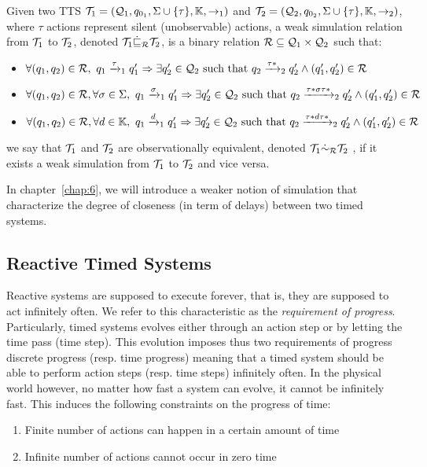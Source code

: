 \begin{definition}
  Given two TTS $\mathcal{T}_{1}=(\mathcal{Q}_{1},q_{0_{1}},\Sigma \cup\{\tau\},\mathbb{K},\to_{1})$ and $\mathcal{T}_{2}=(\mathcal{Q}_{2},q_{0_{2}},\Sigma \cup\{\tau\},\mathbb{K},\to_{2})$, where $\tau$ actions 
  represent silent (unobservable) actions, a weak simulation relation from 
  $\mathcal{T}_1$ to $\mathcal{T}_2$, denoted $\mathcal{T}_1\dot{\sqsubseteq}_{\mathcal{R}}\mathcal{T}_2$, 
  is a binary relation $\mathcal{R}\subseteq\mathcal{Q}_1
  \times\mathcal{Q}_2$ such that:
  \begin{itemize}
    \item $\forall(q_1,q_2)\in\mc{R},\ 
      q_1\transitb{\tau}{1}q_1'\Rightarrow\exists q'_2\in\mc{Q}_2 
      \text{ such that } q_2\transitb{\tau*}{2}q_2'\wedge
      (q_1',q_2')\in\mc{R}$
    \item $\forall(q_1,q_2)\in\mc{R},\forall\sigma\in\Sigma,\ 
      q_1\transitb{\sigma}{1}q_1'\Rightarrow\exists q'_2\in\mc{Q}_2 
      \text{ such that } q_2\transitb{\tau*\sigma\tau*}{2}q_2'\wedge
      (q_1',q_2')\in\mc{R}$
    \item $\forall(q_1,q_2)\in\mc{R},\forall d\in\mb{K},\ 
      q_1\transitb{d}{1}q_1'\Rightarrow\exists q'_2\in\mc{Q}_2 
      \text{ such that } q_2\transitb{\tau*d\tau*}{2}q_2'\wedge
      (q_1',q_2')\in\mc{R}$
  \end{itemize}
\end{definition}
  we say that $\mathcal{T}_1$ and $\mathcal{T}_2$ are observationally equivalent,
  denoted $\mathcal{T}_1\dot{\sim}_{\mathcal{R}}\mathcal{T}_2$ , if it exists a weak simulation 
  from $\mathcal{T}_1$ to $\mathcal{T}_2$ and vice versa.
  
  In chapter~\ref{chap:6}, we will introduce a weaker notion of simulation 
  that characterize the degree of closeness (in term of delays)
  between two timed systems. 

\subsection{Reactive Timed Systems}
Reactive systems are supposed to execute forever, that is,
they are supposed to act infinitely often. We refer to this characteristic as 
the \emph{requirement of progress}. 
Particularly, timed systems evolves either through an action step or 
by letting the time pass (time step).
This evolution imposes thus two requirements of progress
discrete progress (resp. time progress) meaning that a timed system
should be able to perform action steps (resp. time steps) infinitely
often. In the physical world however, no matter how fast a system can
evolve, it cannot be infinitely fast. This induces the following constraints
on the progress of time:
\begin{enumerate}
  \item Finite number of actions can happen in a certain amount of time
  \item Infinite number of actions cannot occur in zero time
\end{enumerate}

